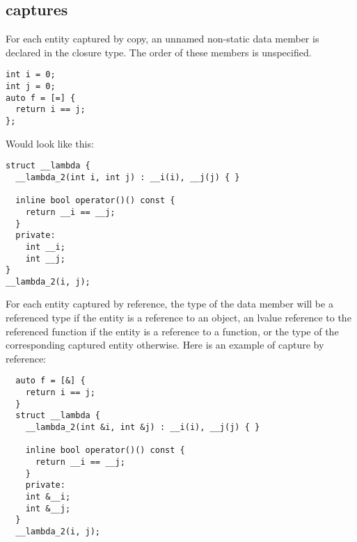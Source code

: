 \documentclass{report}
\begin{document}
\subsection{captures}
For each entity captured by copy, an unnamed non-static data member is declared in the closure type. The order of these members is unspecified.
\begin{verbatim}
int i = 0;
int j = 0;
auto f = [=] {
  return i == j;
};
\end{verbatim}
Would look like this:
\begin{verbatim}
struct __lambda {
  __lambda_2(int i, int j) : __i(i), __j(j) { }

  inline bool operator()() const {
    return __i == __j;
  }
  private:
    int __i;
    int __j;
}
__lambda_2(i, j);
\end{verbatim}
For each entity captured by reference, the type of the data member will be a referenced type if the entity is a reference to an object, an lvalue reference to the referenced function if the entity is a reference to a function, or the type of the corresponding captured entity otherwise.
\noindent Here is an example of capture by reference:
\begin{verbatim}
  auto f = [&] {
    return i == j;
  }
  struct __lambda {
    __lambda_2(int &i, int &j) : __i(i), __j(j) { }

    inline bool operator()() const {
      return __i == __j;
    }
    private:
    int &__i;
    int &__j;
  }
  __lambda_2(i, j);
\end{verbatim}
\end{document}
